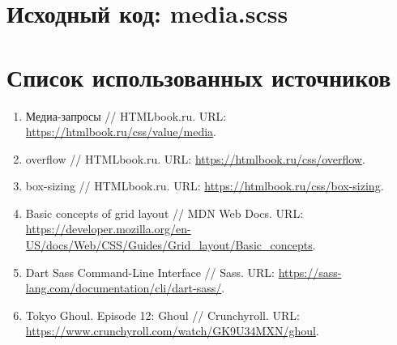 \documentclass[14pt,a4paper]{extarticle}
\newcommand{\listing}[1]{\begingroup\singlespacing\setlength{\topsep}{0pt}\setlength{\partopsep}{0pt}\endgroup}
\begin{document}
\vspace{4mm}
\noindent\begin{minipage}{\textwidth}
\section{Исходный код: media.scss}
\listing{media.scss}
\end{minipage}
\clearpage
\section*{Список использованных источников}
\begin{enumerate}[label=\arabic*.,leftmargin=8mm,itemsep=8pt,parsep=0pt]
\item Медиа-запросы // HTMLbook.ru. URL: \url{https://htmlbook.ru/css/value/media}.
\item overflow // HTMLbook.ru. URL: \url{https://htmlbook.ru/css/overflow}.
\item box-sizing // HTMLbook.ru. URL: \url{https://htmlbook.ru/css/box-sizing}.
\item Basic concepts of grid layout // MDN Web Docs. URL: \url{https://developer.mozilla.org/en-US/docs/Web/CSS/Guides/Grid_layout/Basic_concepts}.
\item Dart Sass Command-Line Interface // Sass. URL: \url{https://sass-lang.com/documentation/cli/dart-sass/}.
\item Tokyo Ghoul. Episode 12: Ghoul // Crunchyroll. URL: \url{https://www.crunchyroll.com/watch/GK9U34MXN/ghoul}.
\end{enumerate}
\end{document}
